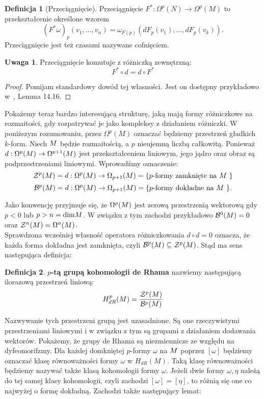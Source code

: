 \documentclass[licencjacka]{pracamgr}
\theoremstyle{definition}
\newtheorem{definition}{Definicja}[section]
\theoremstyle{definition}
\newtheorem{remark}{Uwaga}[section]
\theoremstyle{plain}
\theoremstyle{plain}
\theoremstyle{plain}
\theoremstyle{plain}
\def\M{\ensuremath M}
\begin{document}
\begin{definition}[Przeciągnięcie]
Przeciągnięcie $F^\ast: \Omega^p(N) \rightarrow \Omega^p(M)$ to przekształcenie
określone wzorem
\[
    (F^\ast \omega)_p(v_1, ..., v_n) =
        \omega_{F(p)}(dF_p(v_1), ..., dF_p(v_k)).
\] Przeciągnięcie jest też czasami nazywane cofnięciem.
\end{definition}
\begin{remark}
Przeciągnięcie komutuje z różniczką zewnętrzną:
\[
F^\ast \circ d = d \circ F^\ast
\]
\end{remark}
\begin{proof}
Pomijam standardowy dowód tej własności. Jest on dostępny przykładowo
w~\cite{lee}, Lemma 14.16.
\end{proof}


Pokażemy teraz bardzo interesującą strukturę, jaką mają formy różniczkowe na
rozmaitości, gdy rozpatrywać je jako kompleksy z działaniem różniczki.  W
poniższym rozumowaniu, przez $\Omega^p (M)$ oznaczać będziemy przestrzeń
gładkich $k$-form.  Niech $\M$ będzie rozmaitością, a $p$ nieujemną
liczbą całkowitą.  Ponieważ $d: \Omega^p (\M ) \rightarrow \Omega^{p+1}(\M) $
jest przekształceniem liniowym, jego jądro oraz obraz są podprzestrzeniami
liniowymi. Wprowadźmy oznaczenie:
\[
\mathcal{Z}^p ( \M ) =
d: \Omega^{p} (\M ) \rightarrow \Omega_{p+1}(\M) =
\{\text{$p$-formy zamknięte na $\M$ } \}
\]
\[
\mathcal{B}^p ( \M ) =
d: \Omega^{p} (\M ) \rightarrow \Omega_{p+1}(\M) =
\{\text{$p$-formy dokładne na $\M$ } \}.
\]

Jako konwencję przyjmuje się, że $\Omega^{p} ( \M ) $ jest zerową
przestrzenią wektorową gdy $p < 0$ lub $p > n = \text{dim} \M $. W
związku z tym zachodzi przykładowo $\mathcal{B}^0(\M)=0$ oraz
$\mathcal{Z}^n(\M)= \Omega^n(\M)$. \\

Sprawdzona wcześniej własność operatora różniczkowania $d \circ d = 0$ oznacza,
że każda forma dokładna jest zamknięta, czyli
$ \mathcal{B}^p ( \M) \subseteq \mathcal{Z}^p ( \M) $.
Stąd ma sens następująca definicja:

\begin{definition}
  \textbf{$p$-tą grupą kohomologii de Rhama} nazwiemy następującą
  ilorazową przestrzeń liniową:
  \[
  H^{p}_{dR} ( \M ) = \frac {\mathcal{Z}^p ( \M )} {\mathcal{B}^p ( \M )}
  \]
\end{definition}
Nazwywanie tych przestrzeni grupą jest uzasadnione.  Są one rzeczywistymi
przestrzeniami liniowymi i w związku z tym są grupami z działaniem dodawania
wektorów. Pokażemy, że grupy de Rhama są niezmiennicze ze względu na
dyfeomorifzmy. Dla każdej domkniętej $p$-formy $\omega$ na $\M$ poprzez
$[\omega]$ będziemy oznaczać klasę równoważności formy $\omega$ w $H_{dR} (M)$.
Taką klasę równoważności będziemy nazywać także klasą kohomologii formy
$\omega$. Jeżeli dwie formy $\omega, \eta$ należą do tej samej klasy
kohomologii, czyli zachodzi $[\omega] = [\eta]$, to różnią się one co najwyżej
o formę dokładną. Zachodzi także następujący lemat:
\end{document}
